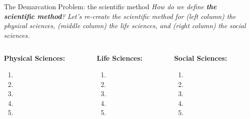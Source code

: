 \documentclass{beamer}
\begin{document}
\begin{frame}{The Demarcation Problem: the scientific method}
\textit{How do we define \textbf{the scientific method}?  Let's re-create the scientific method for (left column) the physical sciences, (middle column) the life sciences, and (right column) the social sciences.} \\ \vspace{0.5cm}
\begin{columns}[T]
\begin{column}{0.33\textwidth}
\textbf{Physical Sciences:}
\begin{enumerate}
\item 
\item 
\item 
\item 
\item 
\end{enumerate}
\end{column}
\begin{column}{0.33\textwidth}
\textbf{Life Sciences:}
\begin{enumerate}
\item 
\item 
\item 
\item 
\item 
\end{enumerate}
\end{column}
\begin{column}{0.33\textwidth}
\textbf{Social Sciences:}
\begin{enumerate}
\item 
\item 
\item 
\item 
\item 
\end{enumerate}
\end{column}
\end{columns}
\end{frame}
\end{document}
